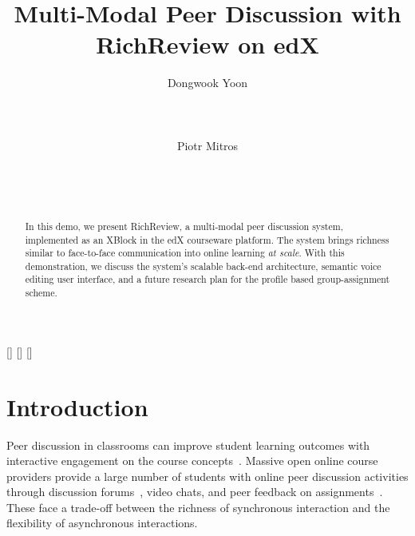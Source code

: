 \documentclass{sigchi}
\begin{document}
\title{Multi-Modal Peer Discussion with RichReview on edX}

\author{
  \alignauthor Dongwook Yoon\\
    \\
    \\
    \\
  \alignauthor Piotr Mitros\\
    \\
    \\
    \\
}

\maketitle

\begin{abstract}
In this demo, we present RichReview, a multi-modal peer discussion system, implemented as an XBlock in the edX courseware platform. The system brings richness similar to face-to-face communication into online learning \emph{at scale}. With this demonstration, we discuss the system's scalable back-end architecture, semantic voice editing user interface, and a future research plan for the profile based group-assignment scheme.
\end{abstract}


[] 
[] 
[] 

\section{Introduction}

Peer discussion in classrooms can improve student learning outcomes with interactive engagement on the course concepts~\cite{chi2014icap}.
Massive open online course providers provide a large number of students with online peer discussion activities through discussion forums~\cite{13Mitros6002}, video chats, and peer feedback on assignments~\cite{linc}. These face a trade-off between the richness of synchronous interaction and the flexibility of asynchronous interactions.
\end{document}
